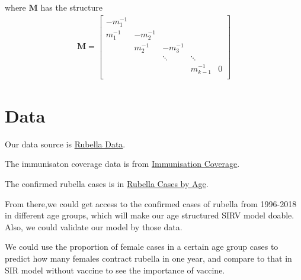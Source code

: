 \documentclass{article}
\begin{document}
  where $\mathbf{M}$ has the structure
\begin{gather*}
\mathbf{M}=\begin{bmatrix}
-m_1^{-1} &      &        &        &    \\
 m_1^{-1} & -m_2^{-1} &        &        &    \\
     &  m_2^{-1} & -m_3^{-1}   &        &    \\
     &      & \ddots & \ddots &    \\
     &      &		 & m_{k-1}^{-1}& 0\\
\end{bmatrix}
\end{gather*}
\section{Data}
Our data source is \href{https://webarchive.nationalarchives.gov.uk/20140505133414/http://www.hpa.org.uk/Topics/InfectiousDiseases/InfectionsAZ/Rubella/EpidemiologicalData/}{Rubella Data}.

The immunisaton coverage data is from \href{https://webarchive.nationalarchives.gov.uk/20140505192935/http://www.hpa.org.uk/web/HPAweb&HPAwebStandard/HPAweb_C/1195733819251}{Immunisation Coverage}.

The confirmed rubella cases is in \href{https://webarchive.nationalarchives.gov.uk/20140505195855/http://www.hpa.org.uk/web/HPAweb&HPAwebStandard/HPAweb_C/1195733752351}{Rubella Cases by Age}.


From there,we could get access to the confirmed cases of rubella from 1996-2018 in different age groups, which will make our age structured SIRV model doable. Also, we could validate our model by those data.

We could use the proportion of female cases in a certain age group cases to predict how many females contract rubella in one year, and compare to that in SIR model without vaccine to see the importance of vaccine.
\end{document}
